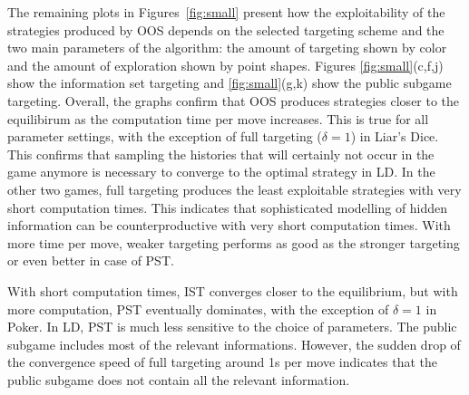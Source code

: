 \documentclass{aamas2015}
\begin{document}
The remaining plots in Figures~\ref{fig:small} present how the exploitability of the strategies produced by OOS depends on the selected targeting scheme and the two main parameters of the algorithm: the amount of targeting shown by color and the amount of exploration shown by point shapes. Figures \ref{fig:small}(c,f,j) show the information set targeting and \ref{fig:small}(g,k) show the public subgame targeting. Overall, the graphs confirm that OOS produces strategies closer to the equilibirum as the computation time per move increases. This is true for all parameter settings, with the exception of full targeting ($\delta=1$) in Liar's Dice. This confirms that sampling the histories that will certainly not occur in the game anymore is necessary to converge to the optimal strategy in LD.
In the other two games, full targeting produces the least exploitable strategies with very short computation times. This indicates that sophisticated modelling of hidden information can be counterproductive with very short computation times. With more time per move, weaker targeting performs as good as the stronger targeting or even better in case of PST.

With short computation times, IST converges closer to the equilibrium, but with more computation, PST eventually dominates, with the exception of $\delta=1$ in Poker. In LD, PST is much less sensitive to the choice of parameters. The public subgame includes most of the relevant informations. However, the sudden drop of the convergence speed of full targeting around 1s per move indicates that the public subgame does not contain all the relevant information.

\end{document}
